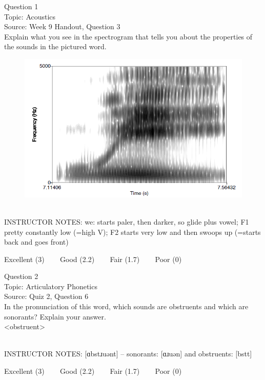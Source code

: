 \documentclass[12pt]{article}
\begin{document}
{\large Question 1}\\

Topic: Acoustics\\
Source: Week 9 Handout, Question 3\\

Explain what you see in the spectrogram that tells you about the properties of the sounds in the pictured word.\\

\begin{figure}[H]
\includegraphics{../images/spectrogram_we.png}
\end{figure}

~\\
INSTRUCTOR NOTES: we: starts paler, then darker, so glide plus vowel; F1 pretty constantly low (=high V); F2 starts very low and then swoops up (=starts back and goes front)


\vfill
Excellent (3) ~~~ Good (2.2) ~~~ Fair (1.7) ~~~ Poor (0)
\newpage

{\large Question 2}\\

Topic: Articulatory Phonetics\\
Source: Quiz 2, Question 6\\

In the pronunciation of this word, which sounds are obstruents and which are sonorants? Explain your answer.\\

<obstruent>


~\\
INSTRUCTOR NOTES: [ɑbstɹuənt] -- sonorants: [ɑɹuən] and obstruents: [bstt]


\vfill
Excellent (3) ~~~ Good (2.2) ~~~ Fair (1.7) ~~~ Poor (0)
\newpage
\end{document}
